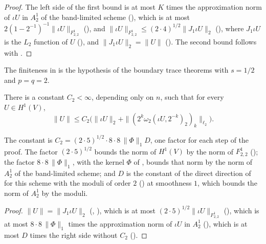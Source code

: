 \begin{proof}
\leanok
The left side of the first bound is at most $K$ times the approximation norm of $\iota U$ in
$A^1_2$ of the band-limited scheme (), which is at most
$2 (1 - 2^{-1})^{-1} \|\iota U\|_{F^1_{2,2}}$ (), and
$\|\iota U\|_{F^1_{2,2}} \leq (2 \cdot 4)^{1/2} \|J_1 \iota U\|_2$
(), where $J_1 \iota U$ is the $L_2$ function of $U$
(), and $\|J_1 \iota U\|_2 = \|U\|$ ().
The second bound follows with .
\end{proof}

The finiteness in  is the hypothesis of the boundary trace
theorems with $s = 1/2$ and $p = q = 2$.

\begin{theorem}
\label{thm:besov-sobolev-one-constant}
\leanok
{}
There is a constant $C_2 < \infty$, depending only on $n$, such that for every $U \in H^1(V)$,
\[
  \|U\| \leq C_2 \bigl(\|\iota U\|_2 + \|(2^k \omega_2(\iota U, 2^{-k})_2)_k\|_{\ell_2}\bigr).
\]
\end{theorem}

The constant is $C_2 = (2 \cdot 5)^{1/2} \cdot 8 \cdot 8 \, \|\Phi\|_1 D$, one factor for each
step of the proof. The factor $(2 \cdot 5)^{1/2}$ bounds the norm of $H^1(V)$ by the norm of
$F^1_{2,2}$ (); the factor $8 \cdot 8 \, \|\Phi\|_1$, with
the kernel $\Phi$ of , bounds that norm by the norm of $A^1_2$ of the
band-limited scheme; and $D$ is the constant of the direct direction of
 for this scheme with the moduli of order $2$
() at smoothness $1$, which bounds the norm of $A^1_2$ by the moduli.

\begin{proof}
\leanok
$\|U\| = \|J_1 \iota U\|_2$ (, ), which is
at most $(2 \cdot 5)^{1/2} \|\iota U\|_{F^1_{2,2}}$ (),
which is at most $8 \cdot 8 \, \|\Phi\|_1$ times the approximation norm of $\iota U$ in $A^1_2$
(), which is at most $D$ times the right side without $C_2$
().
\end{proof}

